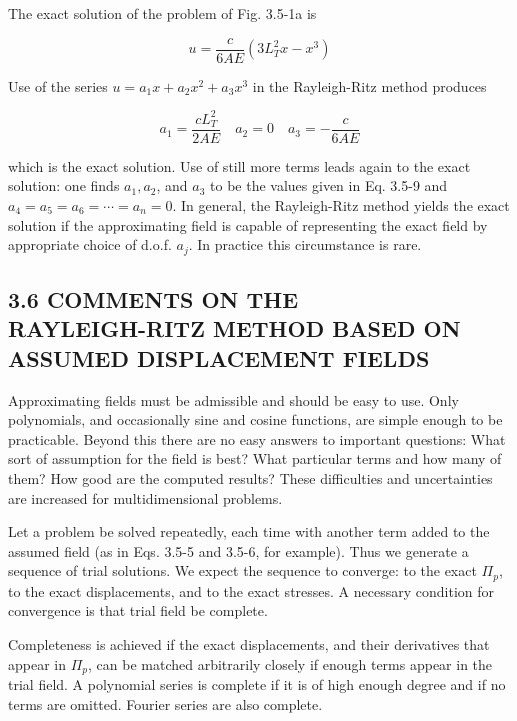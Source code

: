 \documentclass[10pt]{article}
\begin{document}
The exact solution of the problem of Fig. 3.5-1a is

\begin{equation*}
u=\frac{c}{6 A E}\left(3 L_{T}^{2} x-x^{3}\right) \tag{3.5-8}
\end{equation*}

Use of the series $u=a_{1} x+a_{2} x^{2}+a_{3} x^{3}$ in the Rayleigh-Ritz method produces

\begin{equation*}
a_{1}=\frac{c L_{T}^{2}}{2 A E} \quad a_{2}=0 \quad a_{3}=-\frac{c}{6 A E} \tag{3.5-9}
\end{equation*}

which is the exact solution. Use of still more terms leads again to the exact solution: one finds $a_{1}, a_{2}$, and $a_{3}$ to be the values given in Eq. 3.5-9 and $a_{4}=a_{5}=a_{6}=\cdots= a_{n}=0$. In general, the Rayleigh-Ritz method yields the exact solution if the approximating field is capable of representing the exact field by appropriate choice of d.o.f. $a_{j}$. In practice this circumstance is rare.

\subsection*{3.6 COMMENTS ON THE \\
 RAYLEIGH-RITZ METHOD BASED ON ASSUMED DISPLACEMENT FIELDS}

Approximating fields must be admissible and should be easy to use. Only polynomials, and occasionally sine and cosine functions, are simple enough to be practicable. Beyond this there are no easy answers to important questions: What sort of assumption for the field is best? What particular terms and how many of them? How good are the computed results? These difficulties and uncertainties are increased for multidimensional problems.

Let a problem be solved repeatedly, each time with another term added to the assumed field (as in Eqs. 3.5-5 and 3.5-6, for example). Thus we generate a sequence of trial solutions. We expect the sequence to converge: to the exact $\Pi_{p}$, to the exact displacements, and to the exact stresses. A necessary condition for convergence is that trial field be complete.

Completeness is achieved if the exact displacements, and their derivatives that appear in $\Pi_{p}$, can be matched arbitrarily closely if enough terms appear in the trial field. A polynomial series is complete if it is of high enough degree and if no terms are omitted. Fourier series are also complete.
\end{document}
